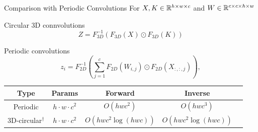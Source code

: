 \begin{frame}{Comparison with Periodic Convolutions}
	For $X, K \in \mathbb{R}^{h \times w \times c}$ and $W \in \mathbb{R}^{c \times c \times h \times w}$

	\alert{Circular 3D connvolutions}
	$$
		Z = F_{3D}^{-1}(F_{3D}(X) \odot F_{3D}(K))
	$$

	\alert{Periodic convolutions}
	$$
		z_{i} = F_{2D}^{-1}( \sum_{j=1}^c F_{2D}(W_{i, j}) \odot F_{2D}(X_{:,:,j})),
	$$

	\begin{center}
		\begin{tabular}{c|c c c c }
        	Type & Params & Forward & Inverse\\
    	\hline
        	Periodic & $h\cdot w \cdot c^2$ & $O(hwc^2)$ & $O(hwc^3)$ \\
        	3D-circular$^\dagger$ & $h \cdot w \cdot c^2$ & $O(hwc^2 \log (hwc))$ & $O(hwc^2 \log (hwc))$ \\
    	\end{tabular}
    \end{center}
\end{frame}
